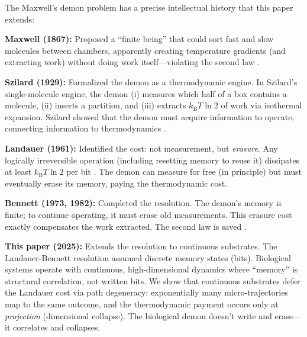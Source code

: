 \documentclass[12pt]{article}
\numberwithin{equation}{section}
\newcommand{\kB}{k_{\mathrm{B}}}
\begin{document}
The Maxwell's demon problem has a precise intellectual history that this paper extends:

\textbf{Maxwell (1867):} Proposed a ``finite being'' that could sort fast and slow molecules between chambers, apparently creating temperature gradients (and extracting work) without doing work itself---violating the second law \cite{leff2002}.

\textbf{Szilard (1929):} Formalized the demon as a thermodynamic engine. In Szilard's single-molecule engine, the demon (i) measures which half of a box contains a molecule, (ii) inserts a partition, and (iii) extracts $\kB T\ln 2$ of work via isothermal expansion. Szilard showed that the demon must acquire information to operate, connecting information to thermodynamics \cite{szilard1929}.

\textbf{Landauer (1961):} Identified the cost: not measurement, but \emph{erasure}. Any logically irreversible operation (including resetting memory to reuse it) dissipates at least $\kB T\ln 2$ per bit \cite{landauer1961}. The demon can measure for free (in principle) but must eventually erase its memory, paying the thermodynamic cost.

\textbf{Bennett (1973, 1982):} Completed the resolution. The demon's memory is finite; to continue operating, it must erase old measurements. This erasure cost exactly compensates the work extracted. The second law is saved \cite{bennett1982}.

\textbf{This paper (2025):} Extends the resolution to continuous substrates. The Landauer-Bennett resolution assumed discrete memory states (bits). Biological systems operate with continuous, high-dimensional dynamics where ``memory'' is structural correlation, not written bits. We show that continuous substrates defer the Landauer cost via path degeneracy: exponentially many micro-trajectories map to the same outcome, and the thermodynamic payment occurs only at \emph{projection} (dimensional collapse). The biological demon doesn't write and erase---it correlates and collapses.
\end{document}
